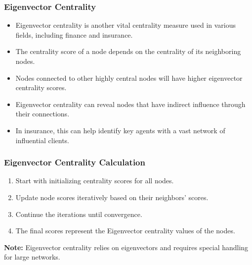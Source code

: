 \begin{frame}[fragile]\frametitle{Eigenvector Centrality}
\begin{itemize}
\item Eigenvector centrality is another vital centrality measure used in various fields, including finance and insurance.
\item The centrality score of a node depends on the centrality of its neighboring nodes.
\item Nodes connected to other highly central nodes will have higher eigenvector centrality scores.
\item Eigenvector centrality can reveal nodes that have indirect influence through their connections.
\item In insurance, this can help identify key agents with a vast network of influential clients.
\end{itemize}
\end{frame}

\begin{frame}[fragile]\frametitle{Eigenvector Centrality Calculation}
\begin{enumerate}
\item Start with initializing centrality scores for all nodes.
\item Update node scores iteratively based on their neighbors' scores.
\item Continue the iterations until convergence.
\item The final scores represent the Eigenvector centrality values of the nodes.
\end{enumerate}

\textbf{Note:} Eigenvector centrality relies on eigenvectors and requires special handling for large networks.
\end{frame}


